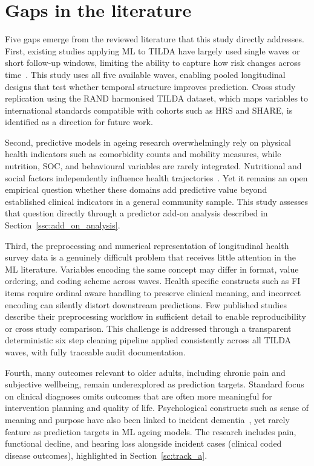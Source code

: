 \section{Gaps in the literature}\label{sc:gaps_literature}
Five gaps emerge from the reviewed literature that this study directly addresses. First, existing studies applying \gls{ML} to \gls{TILDA} have largely used single waves or short follow-up windows, limiting the ability to capture how risk changes across time~\cite{moguilnerImportanceAgePrediction2021, donoghueUsingConditionalInference2023, xuTailoredMachineLearning2023, davisComparisonGaitSpeed2021, boyleBrainpredictedAgeDifference2021}. This study uses all five available waves, enabling pooled longitudinal designs that test whether temporal structure improves prediction. Cross study replication using the \gls{RAND} harmonised \gls{TILDA} dataset, which maps variables to international standards compatible with cohorts such as \gls{HRS} and \gls{SHARE}, is identified as a direction for future work.

Second, predictive models in ageing research overwhelmingly rely on physical health indicators such as comorbidity counts and mobility measures, while nutrition, \gls{SOC}, and behavioural variables are rarely integrated. Nutritional and social factors independently influence health trajectories~\cite{murphyPlasmaLuteinZeaxanthin2023, bardonPredictorsIncidentMalnutrition2020}. Yet it remains an open empirical question whether these domains add predictive value beyond established clinical indicators in a general community sample. This study assesses that question directly through a predictor add-on analysis described in Section~\ref{ssc:add_on_analysis}.

Third, the preprocessing and numerical representation of longitudinal health survey data is a genuinely difficult problem that receives little attention in the \gls{ML} literature. Variables encoding the same concept may differ in format, value ordering, and coding scheme across waves. Health specific constructs such as \gls{FI} items require ordinal aware handling to preserve clinical meaning, and incorrect encoding can silently distort downstream predictions. Few published studies describe their preprocessing workflow in sufficient detail to enable reproducibility or cross study comparison. This challenge is addressed through a transparent deterministic six step cleaning pipeline applied consistently across all \gls{TILDA} waves, with fully traceable audit documentation.

Fourth, many outcomes relevant to older adults, including chronic pain and subjective wellbeing, remain underexplored as prediction targets. Standard focus on clinical diagnoses omits outcomes that are often more meaningful for intervention planning and quality of life. Psychological constructs such as sense of meaning and purpose have also been linked to incident dementia~\cite{sutinSenseMeaningPurpose2023}, yet rarely feature as prediction targets in \gls{ML} ageing models. The research includes pain, functional decline, and hearing loss alongside incident cases (clinical coded disease outcomes), highlighted in Section~\ref{sc:track_a}.

